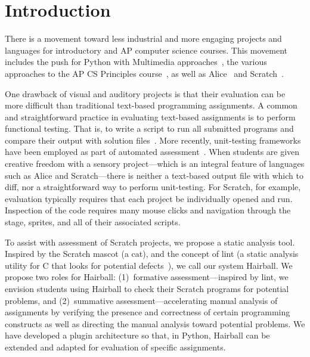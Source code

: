 \section{Introduction}
There is a movement toward less industrial and more engaging projects and
languages for introductory and AP computer science courses.  This movement
includes the push for Python with Multimedia
approaches~\cite{Adams:2012:SLP:2157136.2157319, Forte:2004:CCC:962752.962945,
Simon:2010:ERC:1822090.1822151}, the various approaches to the AP CS Principles
course~\cite{Snyder:2012:FFC:2189835.2189852}, as well as
Alice~\cite{Cooper:2003:TOI:611892.611966} and
Scratch~\cite{Maloney:2010:SPL:1868358.1868363}.

One drawback of visual and auditory projects is that their evaluation can be
more difficult than traditional text-based programming assignments.  A common
and straightforward practice in evaluating text-based assignments is to perform
functional testing. That is, to write a script to run all submitted programs
and compare their output with solution
files~\cite{Jackson:1997:GSP:268084.268210}.  More recently, unit-testing
frameworks have been employed as part of automated
assessment~\cite{Spacco:2006:EMD:1140124.1140131,
  Edwards:2003:RCS:949344.949390}.  When students are given creative freedom
with a sensory project---which is an integral feature of languages such as
Alice and Scratch---there is neither a text-based output file with which to
diff, nor a straightforward way to perform unit-testing.  For Scratch, for
example, evaluation typically requires that each project be individually opened
and run.  Inspection of the code requires many mouse clicks and navigation
through the stage, sprites, and all of their associated scripts.

To assist with assessment of Scratch projects, we propose a static analysis
tool.  Inspired by the Scratch mascot (a cat), and the concept of lint (a
static analysis utility for C that looks for potential
defects~\cite{Johnson78lint}), we call our system Hairball.  We propose two
roles for Hairball: (1)~formative assessment---inspired by lint, we envision
students using Hairball to check their Scratch programs for potential problems,
and (2)~summative assessment---accelerating manual analysis of assignments by
verifying the presence and correctness of certain programming constructs as
well as directing the manual analysis toward potential problems.  We have
developed a plugin architecture so that, in Python, Hairball can be extended
and adapted for evaluation of specific assignments.

